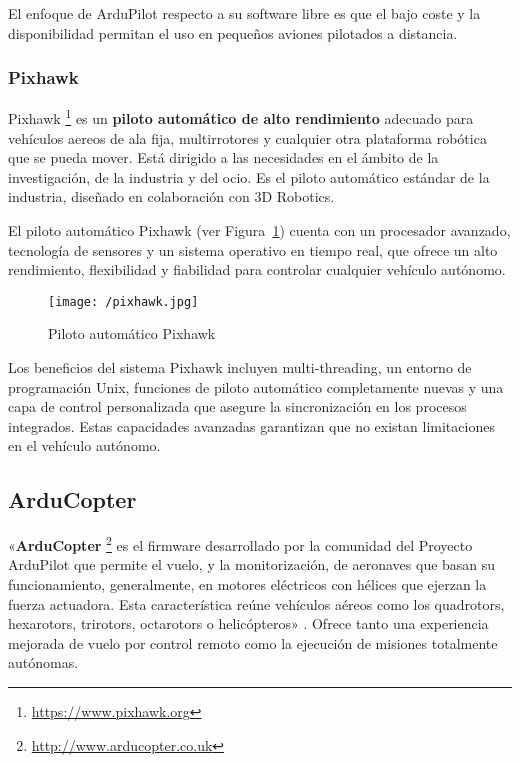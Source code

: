 El enfoque de ArduPilot respecto a su software libre es que el bajo coste y la disponibilidad permitan el uso en pequeños aviones 
pilotados a distancia.

\subsubsection{Pixhawk}
\label{sec:pixhawk}

Pixhawk \footnote{\url{https://www.pixhawk.org}} es un \textbf{piloto automático de alto rendimiento} adecuado para vehículos aereos de ala fija, multirrotores y cualquier otra plataforma robótica que se pueda mover. Está dirigido a las necesidades en el ámbito de la investigación, de la industria y del ocio. Es el piloto automático estándar de la industria, diseñado en colaboración con 3D Robotics.

El piloto automático Pixhawk (ver Figura~\ref{fig:pixhawk}) cuenta con un procesador avanzado, tecnología de sensores y un sistema operativo en tiempo real, que ofrece un alto rendimiento, flexibilidad y fiabilidad para controlar cualquier vehículo autónomo.

\begin{figure}[!h]
\begin{center}
\texttt{[image: /pixhawk.jpg]}
\caption[Piloto automático Pixhawk]{Piloto automático Pixhawk}
\label{fig:pixhawk}
\end{center}
\end{figure}

Los beneficios del sistema Pixhawk incluyen multi-threading, un entorno de programación Unix, funciones de piloto automático completamente nuevas y una capa de control personalizada que asegure la sincronización en los procesos integrados. Estas capacidades avanzadas garantizan que no existan limitaciones en el vehículo autónomo.


\subsection{ArduCopter}
\label{sec:arducopter}

«\textbf{ArduCopter} \footnote{\url{http://www.arducopter.co.uk}} es el firmware desarrollado por la comunidad del Proyecto ArduPilot que permite el vuelo, y la monitorización, de aeronaves que basan su funcionamiento, generalmente, en motores eléctricos con hélices que ejerzan la fuerza actuadora. Esta característica reúne vehículos aéreos como los quadrotors, hexarotors, trirotors, octarotors o helicópteros» \cite{arducopter}. Ofrece tanto una experiencia mejorada de vuelo por control remoto como la ejecución de misiones totalmente autónomas.

